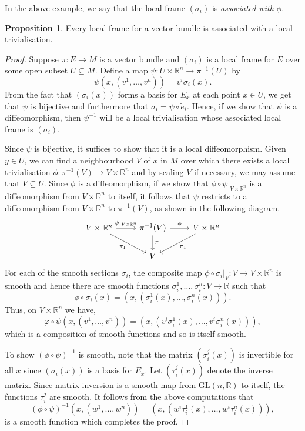 \documentclass[12pt,a4paper]{article}
\numberwithin{equation}{section}
\theoremstyle{definition}
\newtheorem{proposition}{Proposition}[section]
\theoremstyle{remark}
\begin{document}
In the above example, we say that the local frame $(\sigma_i)$ is \textit{associated with $\phi$}.
\begin{proposition}
Every local frame for a vector bundle is associated with a local trivialisation.
\label{vb-lf-lt}
\end{proposition}
\begin{proof}
Suppose $\pi:E\to M$ is a vector bundle and $(\sigma_i)$ is a local frame for $E$ over some open subset $U\subseteq M$. Define a map $\psi:U\times\mathbb{R}^n\to\pi^{-1}(U)$ by
\[
\psi(x,(v^1,\ldots,v^n))=v^i\sigma_i(x).
\]
From the fact that $(\sigma_i(x))$ forms a basis for $E_x$ at each point $x\in U$, we get that $\psi$ is bijective and furthermore that $\sigma_i=\psi\circ\tilde{e}_i$. Hence, if we show that $\psi$ is a diffeomorphism, then $\psi^{-1}$ will be a local trivialisation whose associated local frame is $(\sigma_i)$.

Since $\psi$ is bijective, it suffices to show that it is a local diffeomorphism. Given $y\in U$, we can find a neighbourhood $V$ of $x$ in $M$ over which there exists a local trivialisation $\phi:\pi^{-1}(V)\to V\times\mathbb{R}^n$ and by scaling $V$ if necessary, we may assume that $V\subseteq U$. Since $\phi$ is a diffeomorphism, if we show that $\phi\circ\psi\rvert_{V\times\mathbb{R}^n}$ is a diffeomorphism from $V\times\mathbb{R}^n$ to itself, it follows that $\psi$ restricts to a diffeomorphism from $V\times\mathbb{R}^n$ to $\pi^{-1}(V)$, as shown in the following diagram.
\[
\begin{tikzcd}
V\times\mathbb{R}^n\arrow{dr}[swap]{\pi_1} \arrow{r}{\psi\rvert_{V\times\mathbb{R}^n}} & \pi^{-1}(V) \arrow{r}{\phi} \arrow{d}{\pi} & V\times\mathbb{R}^n \arrow{dl}{\pi_1}\\
& V
\end{tikzcd}
\]
For each of the smooth sections $\sigma_i$, the composite map $\phi\circ\sigma_i\rvert_V:V\to V\times\mathbb{R}^n$ is smooth and hence there are smooth functions $\sigma^1_i,\ldots,\sigma^n_i:V\to\mathbb{R}$ such that
\[
\phi\circ\sigma_i(x)=\left(x,\left(\sigma^1_i(x),\ldots,\sigma^n_i(x) \right) \right).
\]
Thus, on $V\times\mathbb{R}^n$ we have,
\[
\varphi\circ\psi\left(x,(v^1,\ldots,v^n) \right)=\left(x,\left(v^i\sigma^1_i(x),\ldots,v^i\sigma^n_i(x) \right) \right),
\]
which is a composition of smooth functions and so is itself smooth.

To show $(\phi\circ\psi)^{-1}$ is smooth, note that the matrix $(\sigma^j_i(x))$ is invertible for all $x$ since $(\sigma_i(x))$ is a basis for $E_x$. Let $(\tau^j_i(x))$ denote the inverse matrix. Since matrix inversion is a smooth map from $\mathrm{GL}(n,\mathbb{R})$ to itself, the functions $\tau^j_i$ are smooth. It follows from the above computations that
\[
(\phi\circ\psi)^{-1}\left(x,(w^1,\ldots,w^n)\right)=\left(x,\left(w^i\tau^1_i(x),\ldots,w^i\tau^n_i(x) \right) \right),
\]
is a smooth function which completes the proof.
\end{proof}
\end{document}

